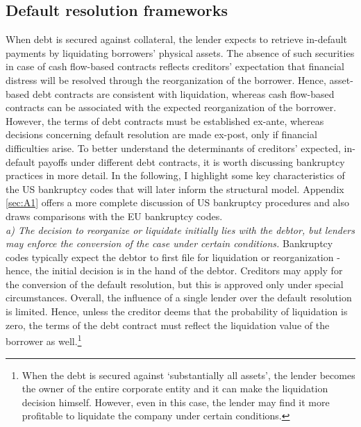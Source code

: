 \documentclass[12pt]{article}
\begin{document}
\subsection{Default resolution frameworks \label{sec: default resolutions}}
When debt is secured against collateral, the lender expects to retrieve in-default payments by liquidating borrowers’ physical assets. The absence of such securities in case of cash flow-based contracts reflects creditors’ expectation that financial distress will be resolved through the reorganization of the borrower. Hence, asset-based debt contracts are consistent with liquidation, whereas cash flow-based contracts can be associated with the expected reorganization of the borrower.  \vspace{3mm} \\
However, the terms of debt contracts must be established ex-ante, whereas decisions concerning default resolution are made ex-post, only if financial difficulties arise. To better understand the determinants of creditors' expected, in-default payoffs under different debt contracts, it is worth discussing bankruptcy practices in more detail. In the following, I highlight some key characteristics of the US bankruptcy codes that will later inform the structural model. Appendix \ref{sec:A1} offers a more complete discussion of US bankruptcy procedures and also draws comparisons with the EU bankruptcy codes. \vspace{3mm} \\
\textit{a) The decision to reorganize or liquidate initially lies with the debtor, but lenders may enforce the conversion of the case under certain conditions.} Bankruptcy codes typically expect the debtor to first file for liquidation or reorganization - hence, the initial decision is in the hand of the debtor. Creditors may apply for the conversion of the default resolution, but this is approved only under special circumstances. Overall, the influence of a single lender over the default resolution is limited. Hence, unless the creditor deems that the probability of liquidation is zero, the terms of the debt contract must reflect the liquidation value of the borrower as well.\footnote{When the debt is secured against `substantially all assets', the lender becomes the owner of the entire corporate entity and it can make the liquidation decision himself. However, even in this case, the lender may find it more profitable to liquidate the company under certain conditions.}  \vspace{3mm} \\
\end{document}
